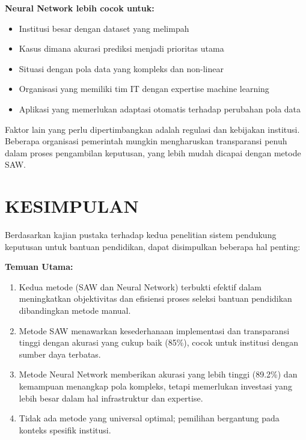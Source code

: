 \documentclass[10pt,a4paper]{article}
\begin{document}
\textbf{Neural Network lebih cocok untuk:}
\begin{itemize}
    \item Institusi besar dengan dataset yang melimpah
    \item Kasus dimana akurasi prediksi menjadi prioritas utama
    \item Situasi dengan pola data yang kompleks dan non-linear
    \item Organisasi yang memiliki tim IT dengan expertise machine learning
    \item Aplikasi yang memerlukan adaptasi otomatis terhadap perubahan pola data
\end{itemize}

Faktor lain yang perlu dipertimbangkan adalah regulasi dan kebijakan institusi. Beberapa organisasi pemerintah mungkin mengharuskan transparansi penuh dalam proses pengambilan keputusan, yang lebih mudah dicapai dengan metode SAW.

\section{KESIMPULAN}

Berdasarkan kajian pustaka terhadap kedua penelitian sistem pendukung keputusan untuk bantuan pendidikan, dapat disimpulkan beberapa hal penting:

\textbf{Temuan Utama:}
\begin{enumerate}
    \item Kedua metode (SAW dan Neural Network) terbukti efektif dalam meningkatkan objektivitas dan efisiensi proses seleksi bantuan pendidikan dibandingkan metode manual.
    
    \item Metode SAW menawarkan kesederhanaan implementasi dan transparansi tinggi dengan akurasi yang cukup baik (85\%), cocok untuk institusi dengan sumber daya terbatas.
    
    \item Metode Neural Network memberikan akurasi yang lebih tinggi (89.2\%) dan kemampuan menangkap pola kompleks, tetapi memerlukan investasi yang lebih besar dalam hal infrastruktur dan expertise.
    
    \item Tidak ada metode yang universal optimal; pemilihan bergantung pada konteks spesifik institusi.
\end{enumerate}
\end{document}
